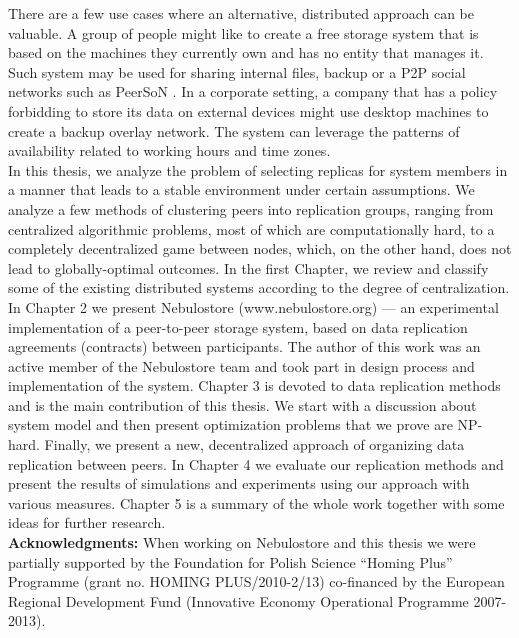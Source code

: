 \documentclass{pracamgren}
\begin{document}
There are a few use cases where an alternative, distributed approach can be valuable. A group of people might like to create a free storage system that is based on the machines they currently own and has no entity that manages it. Such system may be used for sharing internal files, backup or a P2P social networks such as PeerSoN \cite{peerson}. In a corporate setting, a company that has a policy forbidding to store its data on external devices might use desktop machines to create a backup overlay network. The system can leverage the patterns of availability related to working hours and time zones.\\

In this thesis, we analyze the problem of selecting replicas for system members in a manner that leads to a stable environment under certain assumptions.
We analyze a few methods of clustering peers into replication groups, ranging from centralized algorithmic problems, most of which are computationally hard, to a completely decentralized game between nodes, which, on the other hand, does not lead to globally-optimal outcomes.
In the first Chapter, we review and classify some of the existing distributed systems according to the degree of centralization. In Chapter 2 we present Nebulostore (www.nebulostore.org) --- an experimental implementation of a peer-to-peer storage system, based on data replication agreements (contracts) between participants. The author of this work was an active member of the Nebulostore team and took part in design process and implementation of the system. Chapter 3 is devoted to data replication methods and is the main contribution of this thesis. We start with a discussion about system model and then present optimization problems that we prove are NP-hard. Finally, we present a new, decentralized approach of organizing data replication between peers. In Chapter 4 we evaluate our replication methods and present the results of simulations and experiments using our approach with various measures. Chapter 5 is a summary of the whole work together with some ideas for further research.\\

{\bf Acknowledgments:} When working on Nebulostore and this thesis we were partially supported by the
Foundation for Polish Science “Homing Plus” Programme
(grant no. HOMING PLUS/2010-2/13) co-financed by the
European Regional Development Fund (Innovative Economy
Operational Programme 2007-2013).\\

%
%
%
%
\end{document}
